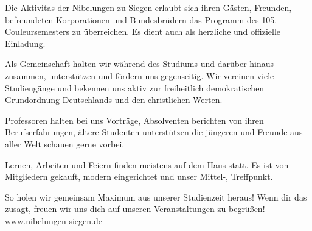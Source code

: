 	\addPage 
	{}
	{\false}
	{}
	{}
	{\SeiteZweiTitel}
	{
		Die Aktivitas der Nibelungen zu Siegen erlaubt sich ihren Gästen, Freunden, befreundeten Korporationen und Bundesbrüdern das Programm des 105. Couleursemesters zu überreichen. Es dient auch als herzliche und offizielle Einladung. \par
		Als Gemeinschaft halten wir während des Studiums und darüber hinaus zusammen, unterstützen und fördern uns gegenseitig. Wir vereinen viele Studiengänge und bekennen uns aktiv zur freiheitlich demokratischen Grundordnung Deutschlands und den christlichen Werten.\par 
		Professoren halten bei uns Vorträge, Absolventen berichten von ihren Berufserfahrungen, ältere Studenten unterstützen die jüngeren und Freunde aus aller Welt schauen gerne vorbei.\par
		Lernen, Arbeiten und Feiern finden meistens auf dem Haus statt. Es ist von Mitgliedern gekauft, modern eingerichtet und unser Mittel-, Treffpunkt.\par
		So holen wir gemeinsam Maximum aus unserer Studienzeit heraus! Wenn dir das zusagt, freuen wir uns dich auf unseren Veranstaltungen zu begrüßen!
		\vfill
		www.nibelungen-siegen.de
	}